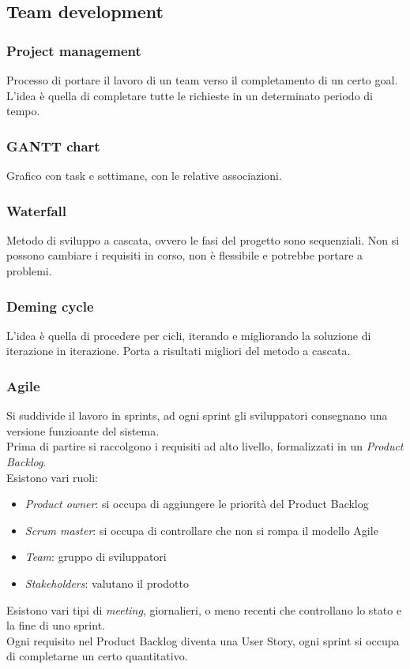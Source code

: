\subsection{Team development}
\subsubsection{Project management}
Processo di portare il lavoro di un team verso il completamento di un certo goal.
L'idea è quella di completare tutte le richieste in un determinato periodo di tempo.

\subsubsection{GANTT chart}
Grafico con task e settimane, con le relative associazioni.

\subsubsection{Waterfall}
Metodo di sviluppo a cascata, ovvero le fasi del progetto sono sequenziali.
Non si possono cambiare i requisiti in corso, non è flessibile e potrebbe 
portare a problemi.

\subsubsection{Deming cycle}
L'idea è quella di procedere per cicli, iterando e migliorando la soluzione
di iterazione in iterazione. Porta a risultati migliori del metodo a cascata.

\subsubsection{Agile}
Si suddivide il lavoro in sprints, ad ogni sprint gli sviluppatori consegnano una versione
funzioante del sistema.\\
Prima di partire si raccolgono i requisiti ad alto livello, formalizzati in un \emph{Product Backlog}.\\
Esistono vari ruoli:
\begin{itemize}
    \item \emph{Product owner}: si occupa di aggiungere le priorità del Product Backlog
    \item \emph{Scrum master}: si occupa di controllare che non si rompa il modello Agile
    \item \emph{Team}: gruppo di sviluppatori
    \item \emph{Stakeholders}: valutano il prodotto
\end{itemize}
Esistono vari tipi di \emph{meeting}, giornalieri, o meno recenti che controllano lo stato e la fine 
di uno sprint.\\
Ogni requisito nel Product Backlog diventa una User Story, ogni sprint si occupa di completarne
un certo quantitativo.
